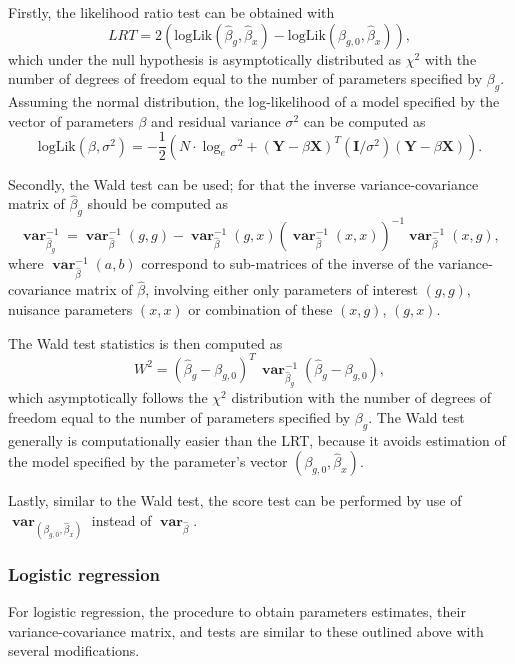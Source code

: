 \documentclass[12pt,a4paper]{article}
\DeclareMathOperator{\var}{\mathbf{var}}
\begin{document}
Firstly, the likelihood ratio test can be obtained with
$$
LRT = 2 \left(\mathrm{logLik}(\hat{\beta}_g,\hat{\beta}_x) -
\mathrm{logLik}(\beta_{g,0},\hat{\beta}_x) \right),
$$
which under the null hypothesis is asymptotically distributed as
$\chi^2$ with the
number of degrees of freedom equal to the number of parameters specified
by $\beta_g$. Assuming the normal distribution, the log-likelihood of a
model specified by the vector of parameters $\beta$ and residual variance
$\sigma^2$ can be computed as
$$
\mathrm{logLik}(\beta,\sigma^2) =
-\frac{1}{2} \left( N \cdot \log_e \sigma^2 +
(\mathbf{Y} - \beta \mathbf{X})^T (\mathbf{I}/\sigma^2) (\mathbf{Y} -
\beta \mathbf{X}) \right).
$$

Secondly, the Wald test can be used; for that the inverse
variance-covariance matrix of $\hat{\beta}_g$ should be computed as
$$
\var_{\hat{\beta}_g}^{-1} = \var_{\hat{\beta}}^{-1}(g,g) -
\var_{\hat{\beta}}^{-1}(g,x) \left(
  \var_{\hat{\beta}}^{-1}(x,x) \right)^{-1}
  \var_{\hat{\beta}}^{-1}(x,g),
$$
where $\var_{\hat{\beta}}^{-1}(a,b)$ correspond to sub-matrices of the
inverse of the variance-covariance matrix of $\hat{\beta}$, involving
either only parameters of interest $(g,g)$, nuisance parameters
$(x,x)$ or combination of these $(x,g)$, $(g,x)$.

The Wald test statistics is then computed as
$$
W^2 = (\hat{\beta}_g - \beta_{g,0})^T \,
\var_{\hat{\beta}_g}^{-1} (\hat{\beta}_g - \beta_{g,0}),
$$
which asymptotically follows the $\chi^2$ distribution with the number
of degrees of freedom equal to the number of parameters specified by
$\beta_g$. The Wald test generally is computationally easier than the
LRT, because it avoids estimation of the model specified by the
parameter's vector $(\beta_{g,0},\hat{\beta}_x)$.

Lastly, similar to the Wald test, the score test can be performed by use
of $\var_{(\beta_{g,0},\hat{\beta}_x)}$ instead of $\var_{\hat{\beta}}$.


\subsubsection{Logistic regression}
For logistic regression, the procedure to obtain
parameters estimates, their variance-covariance matrix, and tests are
similar to these outlined above with several modifications.
\end{document}

